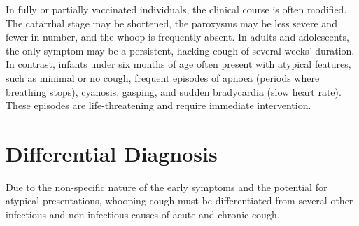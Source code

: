In fully or partially vaccinated individuals, the clinical course is often modified. The catarrhal stage may be shortened, the paroxysms may be less severe and fewer in number, and the whoop is frequently absent. In adults and adolescents, the only symptom may be a persistent, hacking cough of several weeks' duration. In contrast, infants under six months of age often present with atypical features, such as minimal or no cough, frequent episodes of apnoea (periods where breathing stops), cyanosis, gasping, and sudden bradycardia (slow heart rate). These episodes are life-threatening and require immediate intervention.

\section*{Differential Diagnosis}
Due to the non-specific nature of the early symptoms and the potential for atypical presentations, whooping cough must be differentiated from several other infectious and non-infectious causes of acute and chronic cough.
